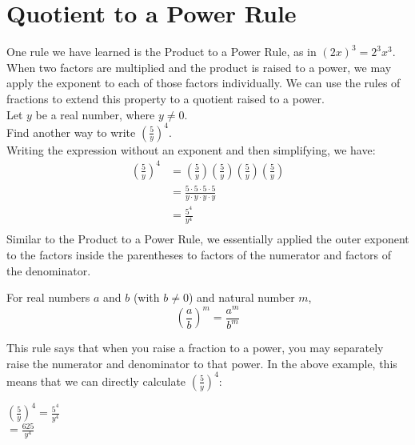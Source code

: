 \documentclass{ximera}
\begin{document}
\section{Quotient to a Power Rule}
  One rule we have learned is the Product to a Power Rule,
      as in $(2x)^{3}=2^{3}x^{3}$.
      When two factors are multiplied and the product is raised to a power,
      we may apply the exponent to each of those factors individually.
      We can use the rules of fractions to extend this property to a
      quotient raised to a power.\\
   Let $y$ be a real number, where $y \neq 0$.\\
          Find another way to write $\left(\frac{5}{y}\right)^4$.\\
     Writing the expression without an exponent and then simplifying, we have:
  \begin{align*}
            \left( \frac{5}{y} \right)^4 &= \left( \frac{5}{y} \right) \left( \frac{5}{y} \right) \left( \frac{5}{y} \right) \left( \frac{5}{y} \right)\\
            &= \frac{5 \cdot 5 \cdot 5 \cdot 5}{y \cdot y \cdot y \cdot y}\\
            &= \frac{5^4}{y^4}\\
\end{align*}
        Similar to the Product to a Power Rule,
          we essentially applied the outer exponent to the factors
          inside the parentheses to factors of the numerator and
          factors of the denominator.
\begin{theorem}
       For real numbers $a$ and $b$
          (with $b \neq 0$)
          and natural number $m$,
        $$
            \left( \frac{a}{b}  \right)^{m} = \frac{a^{m}}{b^{m}}
          $$
\end{theorem}
 This rule says that when you raise a fraction to a power,
      you may separately raise the numerator and denominator to that power.
      In the above example,
      this means that we can directly calculate $\left( \frac{5}{y} \right)^4$:
   \begin{center}
        $\left( \frac{5}{y} \right)^4 = \frac{5^4}{y^4}$\\
        $=\frac{625}{y^4}$
\end{center}
\end{document}
